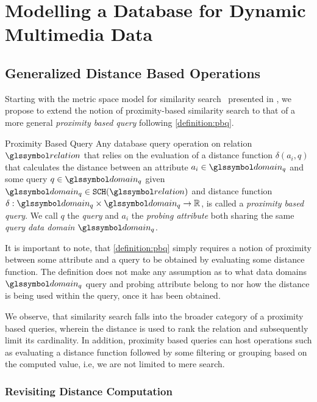 \chapter{Modelling a Database for Dynamic Multimedia Data}
\label{chapter:system_model}

\section{Generalized Distance Based Operations}

Starting with the metric space model for similarity search~\cite{Zezula:2006similarity} presented in , we propose to extend the notion of proximity-based similarity search to that of a more general \emph{proximity based query} following \cref{definition:pbq}.

\begin{definition}[label=definition:pbq]{Proximity Based Query}{}
    Any database query operation on relation $\relation$ that relies on the evaluation of a distance function $\delta(a_{i}, q)$ that calculates the distance between an attribute $a_{i} \in \domain_q$ and some query $q \in \domain_q$ given $\domain_q \in \mathtt{SCH}(\relation)$ and distance function $\delta: \domain_q \times \domain_q \rightarrow \mathbb{R}$, is called a \emph{proximity based query}. We call $q$ the \emph{query} and $a_i$ the \emph{probing attribute} both sharing the same \emph{query data domain} $\domain_q$.
\end{definition}

It is important to note, that \cref{definition:pbq} simply requires a notion of proximity between some attribute and a query to be obtained by evaluating some distance function. The definition does not make any assumption as to what data domains $\domain_q$ query and probing attribute belong to nor how the distance is being used within the query, once it has been obtained. 

We observe, that similarity search falls into the broader category of a proximity based queries, wherein the distance is used to rank the relation and subsequently limit its cardinality. In addition, proximity based queries can host operations such as evaluating a distance function followed by some filtering or grouping based on the computed value, i.e, we are not limited to mere search.

\subsection{Revisiting Distance Computation}

